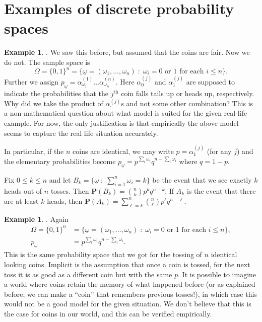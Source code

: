 \documentclass[preprint,  11pt]{amsart}
\newcommand{\parag}[1]{\vspace{4mm}\noindent{\bfseries #1}}
\theoremstyle{plain} %
\theoremstyle{definition} %
\newtheorem{example}[theorem]{Example}
\begin{document}
\section{Examples of discrete probability spaces}
\begin{example} \parag{Toss $n$ coins}. We saw this before, but assumed that the coins are fair. Now we do not. The sample space is
$$
\Omega=\{0,1\}^{n}=\{\underline{\omega}=(\omega_{1},\ldots ,\omega_{n}){\; : \;} \omega_{i}=0 \mbox{ or } 1 \mbox{ for each }i\le n\}.
$$
Further we assign $p_{\underline{\omega}}=\alpha_{\omega_{1}}^{(1)}\ldots \alpha_{\omega_{n}}^{(n)}$. Here $\alpha_{0}^{(j)}$ and $\alpha_{1}^{(j)}$ are supposed to indicate the probabilities that the $j^{\mbox{th}}$ coin falls tails up or heads up, respectively. Why did we take the product of $\alpha^{(j)}_{\cdot}$s and not some other combination? This is a non-mathematical question about what model is suited for the given real-life example. For now, the only justification is that empirically the above model seems to capture the real life situation accurately.

In particular, if the $n$ coins are identical, we may write $p=\alpha_{1}^{(j)}$ (for any $j$) and the elementary probabilities become  $p_{\underline{\omega}}=p^{\sum_{i}\omega_{i}}q^{n-\sum_{i}\omega_{i}}$ where $q=1-p$. 

Fix $0\le k\le n$ and let $B_{k}=\{\underline{\omega}{\; : \;} \sum_{i=1}^{n}\omega_{i}=k\}$ be the event that we see exactly $k$ heads out of $n$ tosses. Then $\mathbf{P}(B_{k})=\binom{n}{k}p^{k}q^{n-k}$. If $A_{k}$ is the event that there are at least $k$ heads, then
$\mathbf{P}(A_{k})=\sum\limits_{\ell=k}^{n}\binom{n}{\ell}p^{\ell}q^{n-\ell}$.
\end{example}

\begin{example} \parag{Toss a coin $n$ times}. Again 
\begin{align*}
\Omega=\{0,1\}^{n}&=\{\underline{\omega}=(\omega_{1},\ldots ,\omega_{n}){\; : \;} \omega_{i}=0 \mbox{ or } 1 \mbox{ for each }i\le n\}, \\
p_{\underline{\omega}}&=p^{\sum_{i}\omega_{i}}q^{n-\sum_{i}\omega_{i}}.
\end{align*}
This is the same probability space that we got for the tossing of $n$ identical looking coins. Implicit is the assumption that once a coin is tossed, for the next toss it is as good as a different coin but with the same $p$. It is possible to imagine a world where coins retain the memory of what happened before (or as explained before, we can make a ``coin'' that remembers previous tosses!), in which case this would not be a good model for the given situation. We don't believe that this is the case for coins in our world, and this can be verified empirically.
\end{example}
\end{document}
